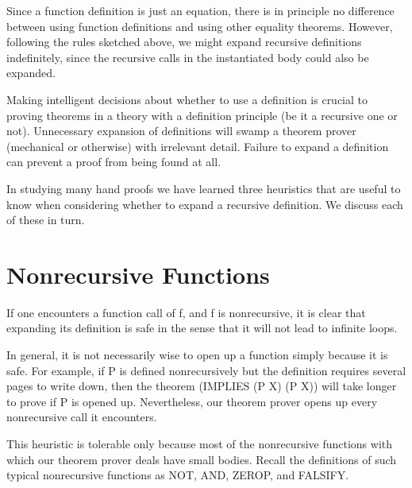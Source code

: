 \documentclass[11pt]{book}
\newcommand{\pubdefaulttextsize}{\large}
\begin{document}
Since a function definition is just
an equation, there is in principle no difference between using function
definitions and using other equality theorems.  However,  following the rules
sketched above, we might expand recursive definitions indefinitely,
since the recursive calls in the instantiated body could also
be expanded.

Making  intelligent decisions about whether to use a definition
is crucial to proving theorems in a theory with a definition
principle (be it a recursive one or not).  Unnecessary expansion of definitions
will swamp a theorem prover (mechanical or otherwise) with irrelevant
detail.  Failure to expand a
definition can prevent a proof from being found at all.

In studying many hand proofs we have learned three heuristics that
are useful to know when considering whether to expand a recursive definition.
We  discuss each of these in turn.
\section{Nonrecursive Functions}
\pubdefaulttextsize
If one encounters a function call of f, and f is  nonrecursive,
it is clear that expanding its definition is safe in the sense that
it will not lead to infinite loops.

In general, it is not necessarily wise to open up a function
simply because it is safe.  For example, if P is defined nonrecursively
but the definition requires several pages to write down, then the
theorem (IMPLIES (P X) (P X)) will take longer to prove if P is opened up.
Nevertheless, our theorem prover opens up every nonrecursive call
it encounters.

This heuristic is tolerable only because most of
the nonrecursive functions with which
our theorem prover deals have small bodies.  Recall the definitions
of such typical nonrecursive functions as NOT, AND, ZEROP, and FALSIFY.
\end{document}
